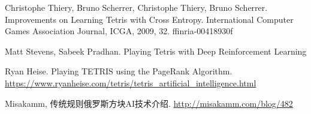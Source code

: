 \documentclass[10pt,UTF8]{article}
\begin{document}
\begin{enumerate}[label={[\arabic*]}]
    \item Christophe Thiery, Bruno Scherrer, Christophe Thiery, Bruno Scherrer. Improvements on Learning Tetris with Cross Entropy. International Computer Games Association Journal, ICGA, 2009, 32. ffinria-00418930f
    \item Matt Stevens, Sabeek Pradhan. Playing Tetris with Deep Reinforcement Learning
    \item Ryan Heise. Playing TETRIS using the PageRank Algorithm. \url{https://www.ryanheise.com/tetris/tetris_artificial_intelligence.html}
    \item Misakamm, 传统规则俄罗斯方块AI技术介绍. \url{http://misakamm.com/blog/482}
\end{enumerate}
\end{document}
